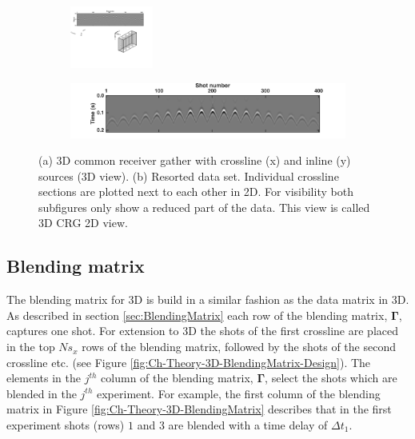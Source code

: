 \begin{figure}
	
	\begin{subfigure}[t]{\textwidth}
	 	\centering
		\includegraphics[width = 0.3\textwidth]{Plots/data3d}
		\caption{}
		\label{fig:Ch-Theory-Data3d}
	\end{subfigure}
	\par\bigskip
	\begin{subfigure}[t]{\textwidth}
		\centering
		\includegraphics[width = \textwidth]{Plots/IdealData3d/p_Delphi}
		\caption{}
		\label{fig:Ch-Theory-Data3d_Delphi}
	\end{subfigure}
	
	\caption{(a) 3D common receiver gather with crossline (x) and inline (y) sources (3D view). (b) Resorted data set. Individual crossline sections are plotted next to each other in 2D. For visibility both subfigures only show a reduced part of the data. This view is called 3D CRG 2D view.}
	\label{fig:Ch-Theory-DataSorting}
\end{figure}


\subsection*{Blending matrix}

The blending matrix for 3D is build in a similar fashion as the data matrix in 3D. As described in section \ref{sec:BlendingMatrix} each row of the blending matrix, $\mathbf{\Gamma}$, captures one shot. For extension to 3D the shots of the first crossline are placed in the top $Ns_x$ rows of the blending matrix, followed by the shots of the second crossline etc. (see Figure \ref{fig:Ch-Theory-3D-BlendingMatrix-Design}). The elements in the $j^{th}$ column of the blending matrix, $\mathbf{\Gamma}$, select the shots which are blended in the $j^{th}$ experiment. For example, the first column of the blending matrix in Figure \ref{fig:Ch-Theory-3D-BlendingMatrix} describes that in the first experiment shots (rows) $1$ and $3$ are blended with a time delay of $\Delta t_1$.

